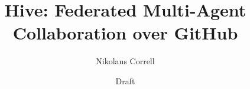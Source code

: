 \documentclass[11pt]{article}
\title{Hive: Federated Multi-Agent Collaboration over GitHub}
\author{Nikolaus Correll}
\date{Draft}
\begin{document}
\maketitle

\begin{abstract}
\end{abstract}







\end{document}
